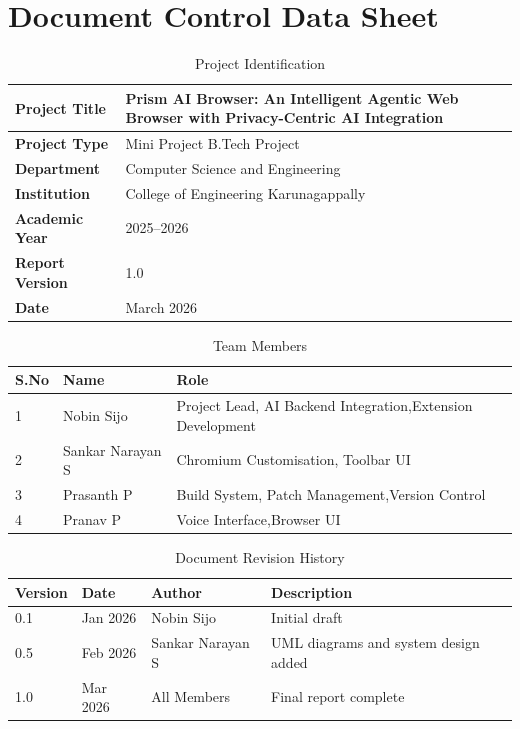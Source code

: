\chapter*{Document Control Data Sheet}

\begin{table}[H]
\centering
\caption{Project Identification}
\begin{tabular}{|p{5cm}|p{9cm}|}
\hline
\textbf{Project Title}     & Prism AI Browser: An Intelligent Agentic Web Browser with Privacy-Centric AI Integration \\ \hline
\textbf{Project Type}      & Mini Project B.Tech Project \\ \hline
\textbf{Department}        & Computer Science and Engineering \\ \hline
\textbf{Institution}       & College of Engineering Karunagappally \\ \hline
\textbf{Academic Year}     & 2025--2026 \\ \hline
\textbf{Report Version}    & 1.0 \\ \hline
\textbf{Date}              & March 2026 \\ \hline
\end{tabular}
\end{table}

\begin{table}[H]
\centering
\caption{Team Members}
\begin{tabular}{|p{1cm}|p{5cm}|p{7cm}|}
\hline
\textbf{S.No} & \textbf{Name} & \textbf{Role} \\ \hline
1 & Nobin Sijo    & Project Lead, AI Backend Integration,Extension Development \\ \hline
2 & Sankar Narayan S & Chromium Customisation, Toolbar UI \\ \hline
3 & Prasanth P    & Build System, Patch Management,Version Control \\ \hline
4 & Pranav P      & Voice Interface,Browser UI  \\ \hline
\end{tabular}
\end{table}

\begin{table}[H]
\centering
\caption{Document Revision History}
\begin{tabular}{|p{1.5cm}|p{2.5cm}|p{4cm}|p{5cm}|}
\hline
\textbf{Version} & \textbf{Date} & \textbf{Author} & \textbf{Description} \\ \hline
0.1  & Jan 2026 & Nobin Sijo      & Initial draft \\ \hline
0.5  & Feb 2026 & Sankar Narayan S & UML diagrams and system design added \\ \hline
1.0  & Mar 2026 & All Members     & Final report complete \\ \hline
\end{tabular}
\end{table}


